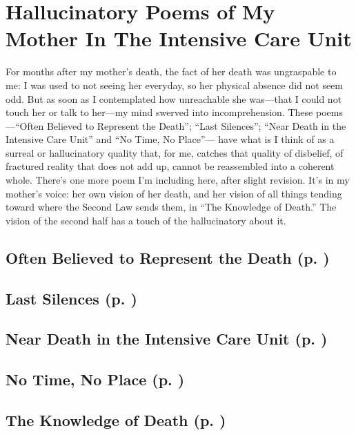 \section*{Hallucinatory Poems of My Mother In The Intensive Care Unit}

For months after my mother's death, the fact of her death was ungraspable to me:
I was used to not seeing her everyday, so her physical absence did not seem odd.
But as soon as I contemplated how unreachable she was---that I could not touch
her or talk to her---my mind swerved into incomprehension. These poems---``Often
Believed to Represent the Death''; ``Last Silences''; ``Near Death in the
Intensive Care Unit'' and ``No Time, No Place''--- have what is I think of as a
surreal or hallucinatory quality that, for me, catches that quality of
disbelief, of fractured reality that does not add up, cannot be reassembled into
a coherent whole. There's one more poem I'm including here, after slight
revision. It's in my mother's voice: her own vision of her death, and her vision
of all things tending toward where the Second Law sends them, in ``The Knowledge
of Death.'' The vision of the second half has a touch of the hallucinatory about
it.

\subsection{Often Believed to Represent the Death (p. \pageref{ch:oftenbelieved})}
\subsection{Last Silences  (p. \pageref{ch:lastsilences})}
\subsection{Near Death in the Intensive Care Unit (p. \pageref{ch:neardeath})}
\subsection{No Time, No Place (p. \pageref{ch:notime})}
\subsection{The Knowledge of Death (p. \pageref{ch:theknowledge})}